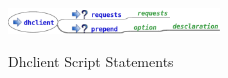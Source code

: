 \begin{figure}[htp]
\centering
\includegraphics[width=0.5\textwidth]{dhclient_service_script}
\label{fig:dhclient_script_statements}
\caption{Dhclient Script Statements}
\end{figure}

